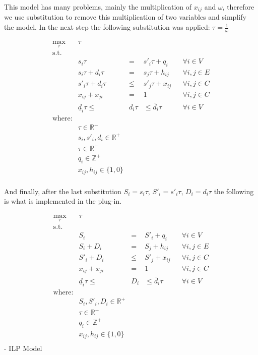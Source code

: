 This model has many problems, mainly the multiplication of $x_{ij}$ and  $\omega$, therefore we use substitution to remove this multiplication of two variables and simplify the model. In the next step the following substitution was applied: $\tau = \frac{1}{\omega}$

\begin{equation}
\begin{matrix}
\displaystyle \max_\tau & \tau  \\
\textrm{s.t.} \\
& s_i \tau & = & s'_i \tau + q_i & & \forall i \in V \\
& s_i \tau + d_i \tau & = & s_j \tau + h_{ij} & & \forall i, j \in E \\
& s'_i \tau + d_i \tau & \leq & s'_j \tau + x_{ij} & & \forall i, j \in C \\
& x_{ij} + x_{ji} & = & 1 & & \forall i, j \in C \\
& \underline{d}_i \tau \leq &  d_i \tau & \leq \overline{d}_i \tau & & \forall i \in V \\

\textrm{where:} \\
& \tau \in \mathbb{R}^+\\
& s_i, s'_i, d_i \in \mathbb{R}^+\\
& \tau \in \mathbb{R}^+ \\
& q_i \in \mathbb{Z}^+\\
& x_{ij}, h_{ij} \in \{1, 0\} \\

\end{matrix}
\end{equation}

And finally, after the last substitution $ S_i = s_i \tau $, $ S'_i = s'_i \tau $, $ D_i = d_i \tau $ the following is what is implemented in the plug-in.

\begin{equation}
\begin{matrix}
\displaystyle \max_\tau & \tau  \\
\textrm{s.t.} \\
& S_i & = & S'_i + q_i & & \forall i \in V \\
& S_i + D_i & = & S_j + h_{ij} & & \forall i, j \in E \\
& S'_i + D_i & \leq & S'_j + x_{ij} & & \forall i, j \in C \\
& x_{ij} + x_{ji} & = & 1 & & \forall i, j \in C \\
& \underline{d}_i \tau \leq &  D_i & \leq \overline{d}_i \tau & & \forall i \in V \\

\textrm{where:} \\
& S_i, S'_i, D_i \in \mathbb{R}^+\\
& \tau \in \mathbb{R}^+ \\
& q_i \in \mathbb{Z}^+\\
& x_{ij}, h_{ij} \in \{1, 0\} \\

\end{matrix}
\end{equation}
- ILP Model